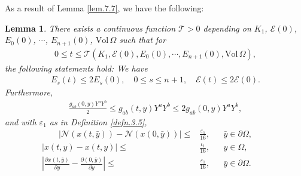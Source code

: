 \documentclass[12pt,reqno]{amsart}
\numberwithin{equation}{section}
\newtheorem{lemma}[theorem]{Lemma}
\theoremstyle{definition}
\theoremstyle{remark}
\begin{document}
As a result of Lemma \ref{lem.7.7}, we have the following:

\begin{lemma}\label{lem.7.8}
  There exists a continuous function ${\mathcal{T}}>0$ depending on $K_1$, ${\mathcal{E}}(0)$, $E_0(0)$, $\cdots$, $E_{n+1}(0)$, ${\mathrm{Vol}\,}\Omega$ such that for
  \begin{align}
    0{\leqslant} t{\leqslant} {\mathcal{T}}(K_1,{\mathcal{E}}(0),E_0(0),\cdots, E_{n+1}(0),{\mathrm{Vol}\,}\Omega),
  \end{align}
  the following statements hold: We have
  \begin{align}\label{eq.7.37}
    E_s(t){\leqslant} 2E_s(0), \quad 0{\leqslant} s{\leqslant} n+1, \quad {\mathcal{E}}(t){\leqslant} 2{\mathcal{E}}(0).
  \end{align}
  Furthermore,
  \begin{align}\label{eq.7.38}
    \frac{g_{ab}(0,y)Y^aY^b}{2}{\leqslant} g_{ab}(t,y)Y^aY^b{\leqslant} 2g_{ab}(0,y)Y^aY^b,
  \end{align}
  and with ${\varepsilon}_1$ as in Definition \ref{defn.3.5},
  \begin{align}
    \qquad{\left\vert{{\mathcal{N}}(x(t,\bar{y}))-{\mathcal{N}}(x(0,\bar{y}))}\right\vert}{\leqslant}&\frac{{\varepsilon}_1}{16}, &&\bar{y}\in{\partial}\Omega,\qquad\label{eq.7.39}\\
    {\left\vert{x(t,y)-x(t,y)}\right\vert}{\leqslant}&\frac{\iota_1}{16}, &&y\in\Omega,\label{eq.7.40}\\
    {\left\vert{\frac{{\partial} x(t,\bar{y})}{{\partial} y}-\frac{{\partial} (0,\bar{y})}{{\partial} y}}\right\vert}{\leqslant} &\frac{{\varepsilon}_1}{16}, &&\bar{y}\in{\partial}\Omega.\label{eq.7.41}
  \end{align}
\end{lemma}
\end{document}
